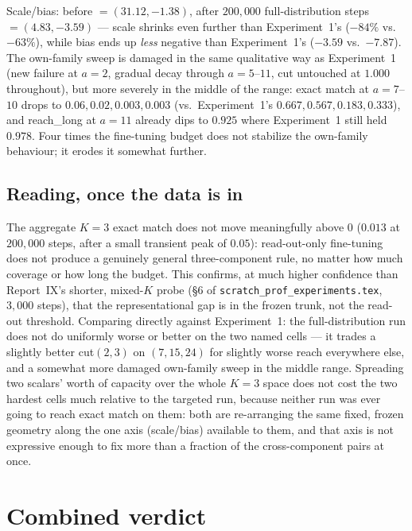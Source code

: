 \documentclass[11pt,a4paper]{article}
\begin{document}
Scale/bias: before $=(31.12,-1.38)$, after $200{,}000$ full-distribution steps
$=(4.83,-3.59)$ --- scale shrinks even further than Experiment~1's ($-84\%$ vs.\ $-63\%$),
while bias ends up \emph{less} negative than Experiment~1's ($-3.59$ vs.\ $-7.87$). The
own-family sweep is damaged in the same qualitative way as Experiment~1 (new failure at
$a{=}2$, gradual decay through $a{=}5$--$11$, cut untouched at $1.000$ throughout), but more
severely in the middle of the range: exact match at $a{=}7$--$10$ drops to $0.06, 0.02, 0.003,
0.003$ (vs.\ Experiment~1's $0.667, 0.567, 0.183, 0.333$), and reach\_long at $a{=}11$ already
dips to $0.925$ where Experiment~1 still held $0.978$. Four times the fine-tuning budget does
not stabilize the own-family behaviour; it erodes it somewhat further.

\subsection{Reading, once the data is in}
\label{sec:verdict-b}

The aggregate $K{=}3$ exact match does not move meaningfully above $0$ ($0.013$ at
$200{,}000$ steps, after a small transient peak of $0.05$): read-out-only fine-tuning does not
produce a genuinely general three-component rule, no matter how much coverage or how long the
budget. This confirms, at much higher confidence than Report~IX's shorter, mixed-$K$ probe
(\S6 of \texttt{scratch\_prof\_experiments.tex}, $3{,}000$ steps), that the representational
gap is in the frozen trunk, not the read-out threshold. Comparing directly against
Experiment~1: the full-distribution run does not do uniformly worse or better on the two named
cells --- it trades a slightly better cut$(2,3)$ on $(7,15,24)$ for slightly worse reach
everywhere else, and a somewhat more damaged own-family sweep in the middle range. Spreading
two scalars' worth of capacity over the whole $K{=}3$ space does not cost the two hardest
cells much relative to the targeted run, because neither run was ever going to reach exact
match on them: both are re-arranging the same fixed, frozen geometry along the one axis
(scale/bias) available to them, and that axis is not expressive enough to fix more than a
fraction of the cross-component pairs at once.

\section{Combined verdict}
\label{sec:verdict}
\end{document}
